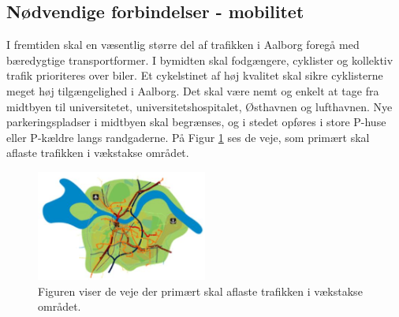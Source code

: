 \subsection{Nødvendige forbindelser - mobilitet}
I fremtiden skal en væsentlig større del af trafikken i Aalborg foregå med bæredygtige transportformer. I bymidten skal fodgængere, cyklister og kollektiv trafik prioriteres over biler. Et cykelstinet af høj kvalitet skal sikre cyklisterne meget høj tilgængelighed i Aalborg. Det skal være nemt og enkelt at tage fra midtbyen til universitetet, universitetshospitalet, Østhavnen og lufthavnen. Nye parkeringspladser i midtbyen skal begrænses, og i stedet opføres i store P-huse eller P-kældre langs randgaderne. På Figur \ref{fig:Mobilitet1} ses de veje, som primært skal aflaste trafikken i vækstakse området.

\begin{figure}[H] 
\centering
\includegraphics[width=0.50\textwidth]{billeder/Mobilitet1}
\caption{Figuren viser de veje der primært skal aflaste trafikken i vækstakse området.}
\label{fig:Mobilitet1}
\end{figure}

